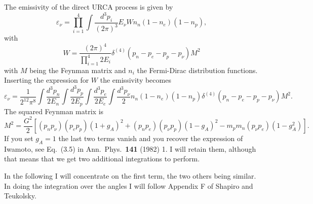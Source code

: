 The emissivity of the direct URCA process is given by
\begin{equation}
      \varepsilon_{\nu}=\prod_{i=1}^{4}\int \frac{d^3p_i}{(2\pi)^3}
                  E_{\nu}Wn_n(1-n_e)(1-n_p),
\end{equation}
with 
\begin{equation}
      W=\frac{(2\pi)^4}{\prod_{i=1}^{4}2E_i}\delta^{(4)}(p_n-p_e-p_p-p_{\nu})M^2
\end{equation}
with $M$ being the Feynman matrix and $n_i$ the Fermi-Dirac distribution
functions. 
Inserting the expression for $W$ the emissivity becomes
\begin{equation}
      \varepsilon_{\nu}=\frac{1}{2^{12}\pi^8}\int \frac{d^3p_n}{2E_n}
                  \int \frac{d^3p_p}{2E_p}\int \frac{d^3p_e}{2E_e}
                  \int \frac{d^3p_{\nu}}{2}
                  n_n(1-n_e)(1-n_p)\delta^{(4)}(p_n-p_e-p_p-p_{\nu})M^2.
      \label{eq:emis}
\end{equation}
The squared Feynman matrix is
\begin{equation}
      M^2=\frac{G^2}{2}\left[(p_np_{\nu})(p_ep_p)(1+g_A)^2+
                             (p_np_e)(p_{\nu}p_p)(1-g_A)^2
                             -m_pm_n(p_{\nu}p_e)(1-g_A^2)\right].
      \label{eq:m}
\end{equation}
If you set $g_A=1$ the last two terms vanish and you recover the expression
of Iwamoto, see Eq.\ (3.5) in Ann.\ Phys.\ {\bf 141} (1982) 1.
I will retain them, although that means that we get two additional
integrations to perform.

In the following I will concentrate on the first term, the two others
being similar. In doing the integration over the angles I will follow
Appendix F of Shapiro and Teukolsky.

